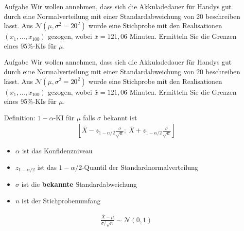 \documentclass[t,11pt]{beamer}
\begin{document}
	\subtitle{}
	\logo{}
	\institute{}
	\date{}
	\subject{}

\addtocounter{framenumber}{-1}

\begin{frame}
\begin{block}{Aufgabe}
	Wir wollen annehmen, dass sich die Akkuladedauer für Handys gut durch eine Normalverteilung mit einer Standardabweichung von 20 beschreiben lässt. Aus $\mathcal{N}(\mu, \sigma^2 = 20^2)$ wurde eine Stichprobe mit den Realisationen $(x_1,\dots,x_{100})$ gezogen, wobei $\bar{x} = 121,06$ Minuten. Ermitteln Sie die Grenzen eines 95\%-KIs für $\mu$.
\end{block}
\end{frame}

\begin{frame}
\begin{block}{Aufgabe}
	Wir wollen annehmen, dass sich die Akkuladedauer für Handys gut durch eine Normalverteilung mit einer Standardabweichung von 20 beschreiben lässt. Aus $\mathcal{N}(\mu, \sigma^2 = 20^2)$ wurde eine Stichprobe mit den Realisationen $(x_1,\dots,x_{100})$ gezogen, wobei $\bar{x} = 121,06$ Minuten. Ermitteln Sie die Grenzen eines 95\%-KIs für $\mu$.
\end{block}
\begin{alertblock}{Definition: $1-\alpha$-KI für $\mu$ falls $\sigma$ bekannt ist}
	\begin{align*}
	\left[ \bar{X} - z_{1-\alpha/2} \frac{\sigma}{\sqrt{n}};~\bar{X} + z_{1-\alpha/2} \frac{\sigma}{\sqrt{n}}  \right]
	\end{align*}
	\vspace{-0.5cm}
	\begin{itemize}
		\item $\alpha$ ist das Konfidenzniveau
		\item $z_{1-\alpha/2}$ ist das $1-\alpha/2$-Quantil der Standardnormalverteilung
		\item $\sigma$ ist die \textbf{bekannte} Standardabweichung
		\item $n$ ist der Stichprobenumfang
	\end{itemize}
\end{alertblock}
\end{frame}

\begin{frame}
	\begin{align*}
		\frac{\bar{X}-\mu}{\sigma/\sqrt{n}}\sim \mathcal{N}(0,1)
	\end{align*}
\end{frame}
\end{document}
